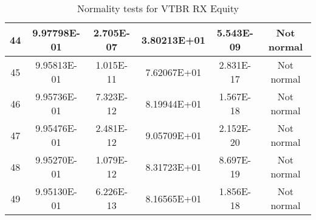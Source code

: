 \begin{table}[h]
\begin{tabular}{|c|c|c|c|c|c|}
		44 & 9.97798E-01 & 2.705E-07 & 3.80213E+01 & 5.543E-09 & Not normal\\\hline
		45 & 9.95813E-01 & 1.015E-11 & 7.62067E+01 & 2.831E-17 & Not normal\\\hline
		46 & 9.95736E-01 & 7.323E-12 & 8.19944E+01 & 1.567E-18 & Not normal\\\hline
		47 & 9.95476E-01 & 2.481E-12 & 9.05709E+01 & 2.152E-20 & Not normal\\\hline
		48 & 9.95270E-01 & 1.079E-12 & 8.31723E+01 & 8.697E-19 & Not normal\\\hline
		49 & 9.95130E-01 & 6.226E-13 & 8.16565E+01 & 1.856E-18 & Not normal\\\hline
	\end{tabular}
	\caption{Normality tests for VTBR RX Equity}
	\label{tab:normality_tests_VTBR_RX}
\end{table}

